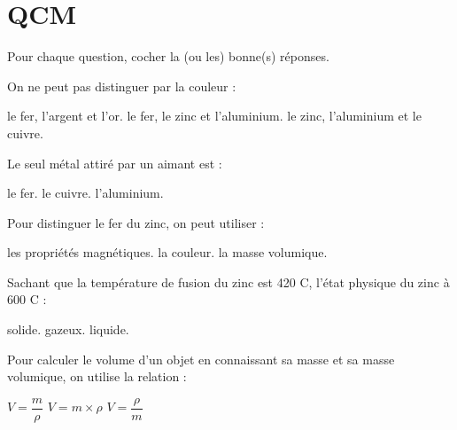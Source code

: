 \section{QCM}\label{ex:qcm}
Pour chaque question, cocher la (ou les) bonne(s) réponses.

\begin{questions}
\question On ne peut pas distinguer par la couleur :\\
\begin{oneparcheckboxes}
	\choice le fer, l'argent et l'or.
	\correctchoice le fer, le zinc et l'aluminium.
	\choice le zinc, l'aluminium et le cuivre.
\end{oneparcheckboxes}

\question Le seul métal attiré par un aimant est :\\
\begin{oneparcheckboxes}
	\correctchoice le fer.
	\choice le cuivre.
	\choice l'aluminium.
\end{oneparcheckboxes}

\question Pour distinguer le fer du zinc, on peut utiliser :\\
\begin{oneparcheckboxes}
	\correctchoice les propriétés magnétiques.
	\choice la couleur.
	\correctchoice la masse volumique.	
\end{oneparcheckboxes}

\question Sachant que la température de fusion du zinc est 420 \degree C, l'état physique du zinc à  600 \degree C :\\
\begin{oneparcheckboxes}
	\choice solide.
	\choice gazeux.
	\correctchoice liquide.	
\end{oneparcheckboxes}

\question Pour calculer le volume d'un objet en connaissant sa masse et sa masse volumique, on utilise la relation :\\
\begin{oneparcheckboxes}
	\correctchoice $V = \dfrac{m}{\rho}$
	\choice $V = m \times \rho$
	\choice $V = \dfrac{\rho}{m}$	
\end{oneparcheckboxes}


\end{questions}
